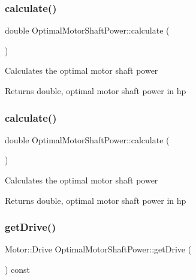 \mbox{\label{class_optimal_motor_shaft_power_a34d47733928ae518fa6f3d08b7d8a12e}} 
\subsubsection{\texorpdfstring{calculate()}{calculate()}\hspace{0.1cm}{\footnotesize\ttfamily [2/3]}}
{\footnotesize\ttfamily double Optimal\+Motor\+Shaft\+Power\+::calculate (\begin{DoxyParamCaption}{ }\end{DoxyParamCaption})}

Calculates the optimal motor shaft power \begin{DoxyReturn}{Returns}
double, optimal motor shaft power in hp 
\end{DoxyReturn}
\mbox{\label{class_optimal_motor_shaft_power_a34d47733928ae518fa6f3d08b7d8a12e}} 
\subsubsection{\texorpdfstring{calculate()}{calculate()}\hspace{0.1cm}{\footnotesize\ttfamily [3/3]}}
{\footnotesize\ttfamily double Optimal\+Motor\+Shaft\+Power\+::calculate (\begin{DoxyParamCaption}{ }\end{DoxyParamCaption})}

Calculates the optimal motor shaft power \begin{DoxyReturn}{Returns}
double, optimal motor shaft power in hp 
\end{DoxyReturn}
\mbox{\label{class_optimal_motor_shaft_power_a3cc369285d8b3582fcd8c44e5a1c37c8}} 
\subsubsection{\texorpdfstring{get\+Drive()}{getDrive()}\hspace{0.1cm}{\footnotesize\ttfamily [1/3]}}
{\footnotesize\ttfamily Motor\+::\+Drive Optimal\+Motor\+Shaft\+Power\+::get\+Drive (\begin{DoxyParamCaption}{ }\end{DoxyParamCaption}) const\hspace{0.3cm}{\ttfamily [inline]}}

